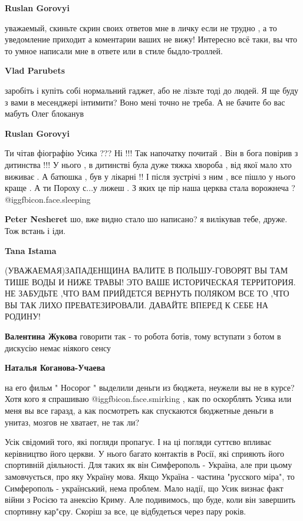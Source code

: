 \begin{itemize}
\begin{itemize}
\textbf{Ruslan Gorovyi} 

уважаемый, скиньте скрин своих ответов мне в личку если не трудно , а то
уведомление приходит а коментарии ваших не вижу! Интересно всё таки, вы что то
умное написали мне в ответе или в стиле быдло-троллей.


\textbf{Vlad Parubets} 

заробіть і купіть собі нормальний гаджет, або не лізьте тоді до людей. Я ще
буду з вами в месенджері інтимити? Воно мені точно не треба. А не бачите бо вас
мабуть Олег блоканув

\textbf{Ruslan Gorovyi} 

Ти чітав фіографію Усика ??? Ні !!! Так напочатку почитай . Він в бога повірив
з дитинства !!! У нього , в дитинстві була дуже тяжка хвороба , від якої мало
хто виживає . А батюшка , був у лікарні !! І після зустрічі з ним , все пішло у
нього краще . А ти Пороху с...у лижеш . З яких це пір наша церква стала ворожнеча
?  @igg{fbicon.face.sleeping} 



\textbf{Peter Nesheret} шо, вже видно стало шо написано? я вилікував тебе, друже. Тож встань і іди.

\textbf{Tana Istama} 

(УВАЖАЕМАЯ)ЗАПАДЕНЩИНА ВАЛИТЕ В ПОЛЬШУ-ГОВОРЯТ ВЫ ТАМ ТИШЕ ВОДЫ И НИЖЕ
ТРАВЫ! ЭТО ВАШЕ ИСТОРИЧЕСКАЯ ТЕРРИТОРИЯ. НЕ ЗАБУДЬТЕ ,ЧТО ВАМ ПРИЙДЕТСЯ ВЕРНУТЬ
ПОЛЯКОМ ВСЕ ТО ,ЧТО ВЫ ТАК ЛИХО ПРЕВАТЕЗИРОВАЛИ. ДАВАЙТЕ ВПЕРЕД К СЕБЕ НА
РОДИНУ!

\textbf{Валентина Жукова} говорити так - то робота ботів, тому вступати з ботом в дискусію немає ніякого сенсу

\textbf{Наталья Коганова-Учаева}

на его фильм " Носорог " выделили деньги из бюджета, неужели вы не в курсе?
Хотя кого я спрашиваю @igg{fbicon.face.smirking} , как по оскорблять Усика или меня вы все гаразд, а как
посмотреть как спускаются бюджетные деньги в унитаз, мозгов не хватает, не так
ли?

\end{itemize} %


Усік свідомий того, які погляди пропагує. І на ці погляди суттєво впливає
керівництво його церкви. У нього багато контактів в Росії, які сприяють його
спортивній діяльності. Для таких як він Симферополь - Україна, але при цьому
замовчується, про яку Україну мова. Якщо Україна - частина "русского міра", то
Симферополь - український, нема проблем. Мало надії, що Усик визнає факт війни
з Росією та анексію Криму. Але подивимось, що буде, коли він завершить
спортивну кар"єру. Скоріш за все, це відбудеться через пару років.


\end{itemize}
